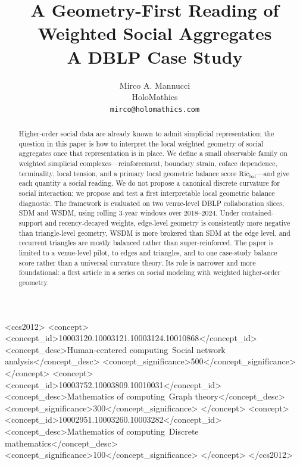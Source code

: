 \documentclass[11pt]{article}
\title{A Geometry-First Reading of Weighted Social Aggregates\\A DBLP Case Study}
\author{Mirco A. Mannucci\\HoloMathics\\\texttt{mirco@holomathics.com}}
\date{}
\newcommand{\ccsdesc}[2][]{}
\newcommand{\Ric}{\mathrm{Ric}}
\begin{document}
\maketitle

\begin{abstract}
Higher-order social data are already known to admit simplicial representation; the question in this paper is how to interpret the local weighted geometry of social aggregates once that representation is in place. We define a small observable family on weighted simplicial complexes---reinforcement, boundary strain, coface dependence, terminality, local tension, and a primary local geometric balance score $\Ric_{\mathrm{bal}}$---and give each quantity a social reading. We do not propose a canonical discrete curvature for social interaction; we propose and test a first interpretable local geometric balance diagnostic. The framework is evaluated on two venue-level DBLP collaboration slices, SDM and WSDM, using rolling 3-year windows over 2018--2024. Under contained-support and recency-decayed weights, edge-level geometry is consistently more negative than triangle-level geometry, WSDM is more brokered than SDM at the edge level, and recurrent triangles are mostly balanced rather than super-reinforced. The paper is limited to a venue-level pilot, to edges and triangles, and to one case-study balance score rather than a universal curvature theory. Its role is narrower and more foundational: a first article in a series on social modeling with weighted higher-order geometry.
\end{abstract}

\begin{CCSXML}
<ccs2012>
<concept>
<concept_id>10003120.10003121.10003124.10010868</concept_id>
<concept_desc>Human-centered computing~Social network analysis</concept_desc>
<concept_significance>500</concept_significance>
</concept>
<concept>
<concept_id>10003752.10003809.10010031</concept_id>
<concept_desc>Mathematics of computing~Graph theory</concept_desc>
<concept_significance>300</concept_significance>
</concept>
<concept>
<concept_id>10002951.10003260.10003282</concept_id>
<concept_desc>Mathematics of computing~Discrete mathematics</concept_desc>
<concept_significance>100</concept_significance>
</concept>
</ccs2012>
\end{CCSXML}

\ccsdesc[500]{Human-centered computing~Social network analysis}
\ccsdesc[300]{Mathematics of computing~Graph theory}
\ccsdesc[100]{Mathematics of computing~Discrete mathematics}
\end{document}
